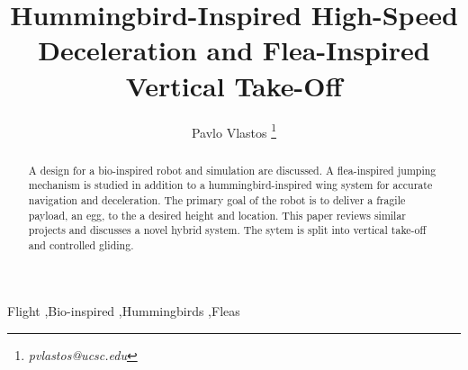 \documentclass[preprint,authoryear,12pt] {elsarticle}
\begin{document}
\begin{frontmatter}

\title{Hummingbird-Inspired High-Speed Deceleration and Flea-Inspired Vertical Take-Off} 

\author{Pavlo Vlastos \footnote{\textit{pvlastos@ucsc.edu}}}

\address{Baskin School of Engineering, UC Santa Cruz}

%
%
\begin{abstract} 
A design for a bio-inspired robot and simulation are discussed. A flea-inspired jumping mechanism is studied in addition to a hummingbird-inspired wing system for accurate navigation and deceleration. The primary goal of the robot is to deliver a fragile payload, an egg, to the a desired height and location. This paper reviews similar projects and discusses a novel hybrid system. The sytem is split into vertical take-off and controlled gliding.\\
\end{abstract}

\begin{keyword}
Flight \sep Bio-inspired \sep Hummingbirds \sep Fleas
\end{keyword}

\end{frontmatter}



 	
 		
 		
 	




\end{document}
